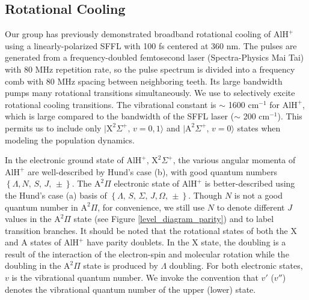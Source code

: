 \documentclass[twoside,twocolumn,9pt]{article}
\begin{document}
\subsection{Rotational Cooling}
Our group has previously demonstrated broadband rotational cooling of $\mathrm{AlH}^+$ using a linearly-polarized SFFL with 100 fs  centered at 360 nm. The pulses are generated from a frequency-doubled femtosecond laser (Spectra-Physics Mai Tai) with 80 MHz repetition rate, so the pulse spectrum is divided into a frequency comb with 80 MHz spacing between neighboring teeth. Its large bandwidth pumps many rotational transitions simultaneously. We use  to selectively excite rotational cooling transitions. The vibrational constant is $\sim$ 1600 cm$^{-1}$ for $\mathrm{AlH}^+$, which is large compared to the bandwidth of the SFFL laser ($\sim$ 200 cm$^{-1}$). This permits us to include only $\lvert \mathrm{X}^2\Sigma^+,\, v = 0,1 \rangle$ and $\lvert \mathrm{A}^2\Sigma^+,\, v = 0 \rangle$ states when modeling the population dynamics.\par 

In the electronic ground state of $\mathrm{AlH}^+$, $\mathrm{X}^2\Sigma^+$, the various angular momenta of $\mathrm{AlH}^+$ are well-described by Hund's case (b), with good quantum numbers  $\left\lbrace\right.\! \Lambda, N,\, S,\, J,\, \pm \!\left.\right\rbrace$. The $\mathrm{A}^2\Pi$ electronic state of $\mathrm{AlH}^+$ is better-described using the Hund's case (a) basis of $\left\lbrace\right.\! \Lambda,\, S,\, \Sigma,\, J, \Omega,\, \pm \!\left.\right\rbrace$. Though $N$ is not a good quantum number in $\mathrm{A}^2\Pi$, for convenience, we still use $N$ to denote different $J$ values in the $\mathrm{A}^2\Pi$ state (see Figure \ref{level_diagram_parity}) and to label transition branches. It should be noted that the rotational states of both the $\mathrm{X}$ and $\mathrm{A}$ states of $\mathrm{AlH}^+$ have parity doublets. In the $\mathrm{X}$ state, the doubling is a result of the interaction of the electron-spin and molecular rotation while the doubling in the $\mathrm{A}^2\Pi$ state is produced by $\Lambda$ doubling. For both electronic states, $v$ is the vibrational quantum number. We invoke the convention that $v'$ ($v''$) denotes the vibrational quantum number of the upper (lower) state.
\end{document}
